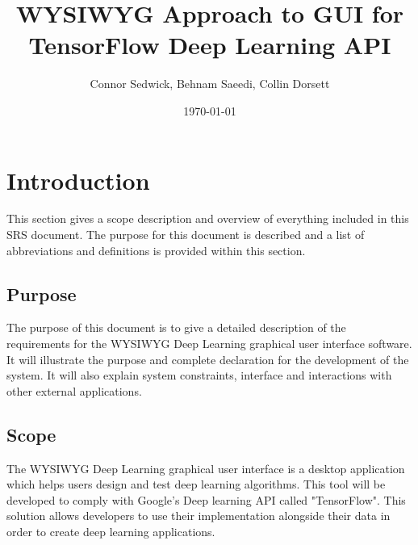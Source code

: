 \documentclass[journal,10pt,onecolumn,compsoc]{IEEEtran} \usepackage[margin=1.0in]{geometry} \usepackage{pdfpages} \usepackage{graphicx}
\title{WYSIWYG Approach to GUI for TensorFlow Deep Learning API}
\author{Connor Sedwick, Behnam Saeedi,  Collin Dorsett}
\date{\today}
\begin{document}
\maketitle
\newpage
\tableofcontents
\newpage
\section{Introduction}

This section gives a scope description and overview of everything included in this SRS document. 
The purpose for this document is described and a list of abbreviations and definitions is provided within this section.

\subsection{Purpose}

The purpose of this document is to give a detailed description of the requirements for the WYSIWYG Deep Learning graphical user interface software. It will illustrate the purpose and complete declaration for the development of the system. It will also explain system constraints, interface and interactions with other external applications. 

\subsection{Scope}

The WYSIWYG Deep Learning graphical user interface is a desktop application which helps users design and test deep learning algorithms.
This tool will be developed to comply with Google's Deep learning API called "TensorFlow".
This solution allows developers to use their implementation alongside their data in order to create deep learning applications.
\end{document}
